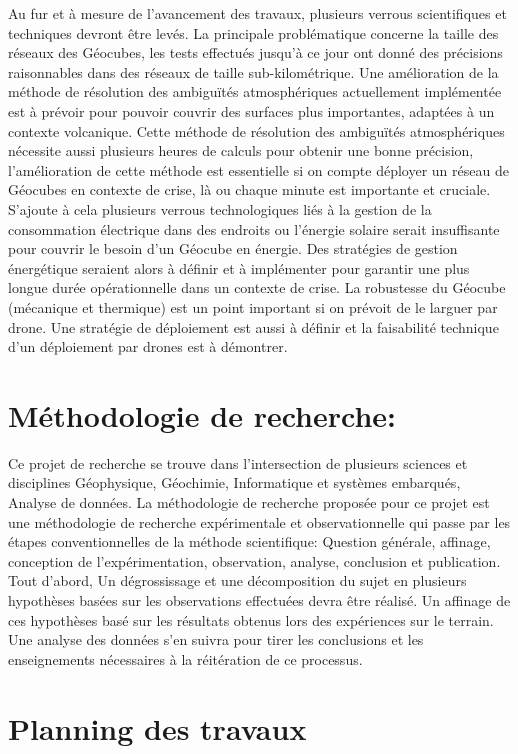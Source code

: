 \documentclass{themeensg}
\begin{document}
\begin{appendices}
Au fur et à mesure de l'avancement des travaux, plusieurs verrous scientifiques et techniques devront être levés. La principale problématique concerne la taille des réseaux des Géocubes, les tests effectués jusqu'à ce jour ont donné des précisions raisonnables dans des réseaux de taille sub-kilométrique. Une amélioration de la méthode de résolution des ambiguïtés atmosphériques actuellement implémentée est à prévoir pour pouvoir couvrir des surfaces plus importantes, adaptées à un contexte volcanique. Cette méthode de résolution des ambiguïtés atmosphériques nécessite aussi plusieurs heures de calculs pour obtenir une bonne précision, l'amélioration de cette méthode est essentielle si on compte déployer un réseau de Géocubes en contexte de crise, là ou chaque minute est importante et cruciale. S'ajoute à cela plusieurs verrous technologiques liés à la gestion de la consommation électrique dans des endroits ou l'énergie solaire serait insuffisante pour couvrir le besoin d'un Géocube en énergie. Des stratégies de gestion énergétique seraient alors à définir et à implémenter pour garantir une plus longue durée opérationnelle dans un contexte de crise. La robustesse du Géocube (mécanique et thermique) est un point important si on prévoit de le larguer par drone. Une stratégie de déploiement est aussi à définir et la faisabilité technique d'un déploiement par drones est à démontrer.

\section*{Méthodologie de recherche:}

Ce projet de recherche se trouve dans l'intersection de plusieurs sciences et disciplines Géophysique, Géochimie, Informatique et systèmes embarqués, Analyse de données. La méthodologie de recherche proposée pour ce projet est une méthodologie de recherche expérimentale et observationnelle qui passe par les étapes conventionnelles de la méthode scientifique: Question générale, affinage, conception de l'expérimentation, observation, analyse, conclusion et publication. Tout d'abord, Un dégrossissage et une décomposition du sujet en plusieurs hypothèses basées sur les observations effectuées devra être réalisé. Un affinage de ces hypothèses basé sur les résultats obtenus lors des expériences sur le terrain. Une analyse des données s'en suivra pour tirer les conclusions et les enseignements nécessaires à la réitération de ce processus.

\section*{Planning des travaux}


\end{appendices}
\end{document}
